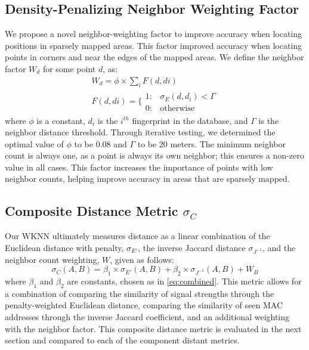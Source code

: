 \documentclass[conference]{IEEEtran}
\begin{document}
\subsection{Density-Penalizing Neighbor Weighting Factor}\label{subsec:density_penalizing_neighbor_weighting}
\indent We propose a novel neighbor-weighting factor to improve accuracy when locating positions in sparsely mapped areas. This factor improved accuracy when locating points in corners and near the edges of the mapped areas. We define the neighbor factor $W_d$ for some point $d$, as:
\begin{equation}
\label{eq:density}
\begin{split}
W_d=\phi\times\sum\limits_{i}F(d,di)\\
F(d,di)=\{\begin{array}{lr}
       1: &  \sigma_E(d, d_i) < \Gamma \\
       0: &  \text{otherwise}
\end{array}
\end{split}
\end{equation}
where $\phi$ is a constant, $d_i$ is the $i^{th}$ fingerprint in the database, and $\Gamma$ is the neighbor distance threshold. Through iterative testing, we determined the optimal value of $\phi$ to be 0.08 and $\Gamma$ to be 20 meters. The minimum neighbor count is always one, as a point is always its own neighbor; this ensures a non-zero value in all cases. This factor increases the importance of points with low neighbor counts, helping improve accuracy in areas that are sparsely mapped. 

\subsection{Composite Distance Metric $\sigma_C$}
\indent Our WKNN ultimately measures distance as a linear combination of the Euclidean distance with penalty, $\sigma_{E'}$,  the inverse Jaccard distance $\sigma_{J^{-1}}$, and the neighbor count weighting, $W$,  given as follows:
\begin{equation}
\label{eq:composite}
\sigma_C(A, B)=\beta_1\times\sigma_{E'}(A, B)+\beta_2\times\sigma_{J^{-1}}(A, B)+W_B
\end{equation}
where $\beta_1$ and $\beta_2$ are constants, chosen as in \ref{eq:combined}. This metric allows for a combination of comparing the similarity of signal strengths through the penalty-weighted Euclidean distance, comparing the similarity of seen MAC addresses through the inverse Jaccard coefficient, and an additional weighting with the neighbor factor. This composite distance metric is evaluated in the next section and compared to each of the component distant metrics.
\end{document}
